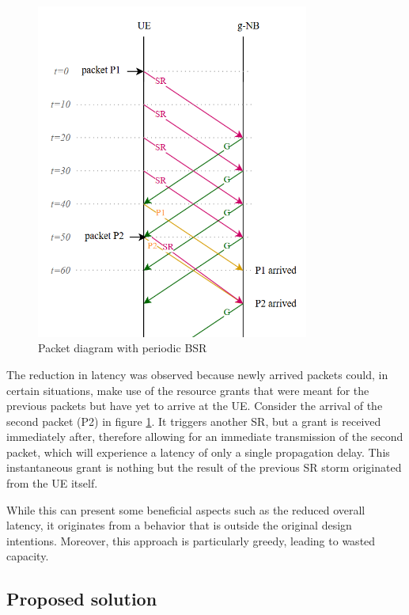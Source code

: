 \begin{figure}[ht]
    \centering
    \includegraphics[width=0.8\textwidth]{res/diagram-wasted-grants.png}
    \caption{Packet diagram with periodic \ac{BSR}}
    \label{fig:diagram-wasted-capacity}
\end{figure}

The reduction in latency was observed because newly arrived packets could, in certain situations, make use of the resource grants that were meant for the previous packets but have yet to arrive at the \ac{UE}. Consider the arrival of the second packet (P2) in figure \ref{fig:diagram-wasted-capacity}. It triggers another \ac{SR}, but a grant is received immediately after, therefore allowing for an immediate transmission of the second packet, which will experience a latency of only a single propagation delay. This instantaneous grant is nothing but the result of the previous \ac{SR} storm originated from the \ac{UE} itself.

While this can present some beneficial aspects such as the reduced overall latency, it originates from a behavior that is outside the original design intentions. Moreover, this approach is particularly greedy, leading to wasted capacity.

\subsection{Proposed solution}

